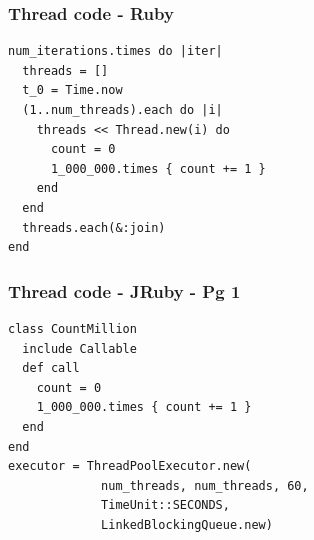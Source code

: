\begin{frame}[fragile]\frametitle{Thread code - Ruby}
\begin{lstlisting}
num_iterations.times do |iter|
  threads = []
  t_0 = Time.now
  (1..num_threads).each do |i|
    threads << Thread.new(i) do
      count = 0
      1_000_000.times { count += 1 }
    end
  end
  threads.each(&:join)
end
\end{lstlisting}
\end{frame}
\begin{frame}[fragile]\frametitle{Thread code - JRuby - Pg 1}
\begin{lstlisting}
class CountMillion
  include Callable
  def call
    count = 0
    1_000_000.times { count += 1 }
  end
end
executor = ThreadPoolExecutor.new(
             num_threads, num_threads, 60,
             TimeUnit::SECONDS,
             LinkedBlockingQueue.new)
\end{lstlisting}
\end{frame}

